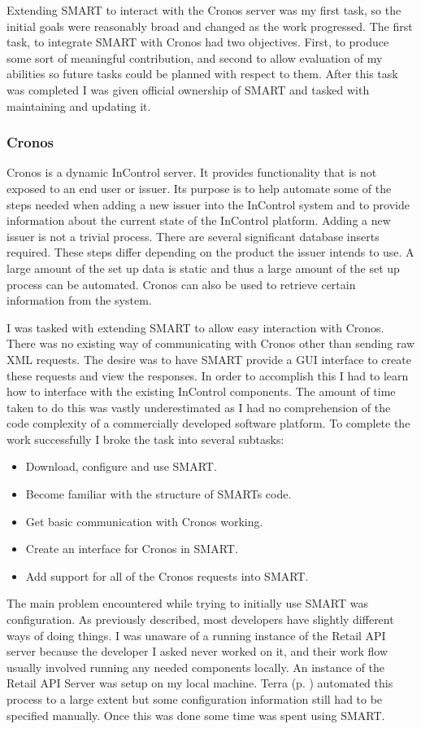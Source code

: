 \documentclass[a4paper, 11pt, titlepage]{article}
\begin{document}
Extending SMART to interact with the Cronos server was my first task, so the initial goals were reasonably broad and changed as the work progressed. The first task, to integrate SMART with Cronos had two objectives. First, to produce some sort of meaningful contribution, and second to allow evaluation of my abilities so future tasks could be planned with respect to them. After this task was completed I was given official ownership of SMART and tasked with maintaining and updating it.  
 
 
\subsubsection{Cronos} 
Cronos is a dynamic InControl server. It provides functionality that is not exposed to an end user or issuer. Its purpose is to help automate some of the steps needed when adding a new issuer into the InControl system and to provide information about the current state of the InControl platform. Adding a new issuer is not a trivial process. There are several significant database inserts required. These steps differ depending on the product the issuer intends to use. A large amount of the set up data is static and thus a large amount of the set up process can be automated. Cronos can also be used to retrieve certain information from the system. 

I was tasked with extending SMART to allow easy interaction with Cronos. There was no existing way of communicating with Cronos other than sending raw XML requests. The desire was to have SMART provide a GUI interface to create these requests and view the responses. 
In order to accomplish this I had to learn how to interface with the existing InControl components. The amount of time taken to do this was vastly underestimated as I had no comprehension of the code complexity of a commercially developed software platform. To complete the work successfully I broke the task into several subtasks: \
\begin{itemize} 
\item Download, configure and use SMART.
\item Become familiar with the structure of SMARTs code. 
\item Get basic communication with Cronos working. 
\item Create an interface for Cronos in SMART. 
\item Add support for all of the Cronos requests into SMART. 
\end{itemize} 
The main problem encountered while trying to initially use SMART was configuration. As previously described, most developers have slightly different ways of doing things. I was unaware of a running instance of the Retail API server because the developer I asked never worked on it, and their work flow usually involved running any needed components locally. An instance of the Retail API Server was setup on my local machine. Terra (p. \pageref{Terra} ) automated this process to a large extent but some configuration information still had to be specified manually. Once this was done some time was spent using SMART.  
 
\end{document}
